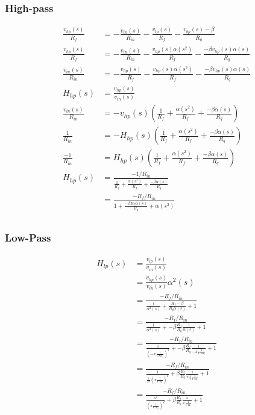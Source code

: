 \documentclass{article}
\begin{document}
\subsubsection{High-pass}

\begin{equation*}
\begin{split}
  \frac{v_{hp}(s)}{R_{f}} & = - \frac{v_{in}(s)}{R_{in}} - \frac{v_{lp}(s)}{R_{f}} - \frac{v_{bp}(s)-\beta}{R_q} \\
  \frac{v_{hp}(s)}{R_{f}} & = - \frac{v_{in}(s)}{R_{in}} - \frac{v_{hp}(s)\alpha(s^2)}{R_{f}} - \frac{{-\beta}v_{hp}(s)\alpha(s)}{R_q} \\
  \frac{v_{in}(s)}{R_{in}} & = - \frac{v_{hp}(s)}{R_{f}} - \frac{v_{hp}(s)\alpha(s^2)}{R_{f}} - \frac{{-\beta}v_{hp}(s)\alpha(s)}{R_q} \\
  H_{hp}(s) & = \frac{v_{hp}(s)}{v_{in}(s)} \\
  \frac{v_{in}(s)}{R_{in}} & = - v_{hp}(s)(\frac{1}{R_{f}} + \frac{\alpha(s^2)}{R_{f}} + \frac{{-\beta}\alpha(s)}{R_q}) \\
  \frac{1}{R_{in}} & = - H_{hp}(s)(\frac{1}{R_{f}} + \frac{\alpha(s^2)}{R_{f}} + \frac{{-\beta}\alpha(s)}{R_q}) \\
  \frac{-1}{R_{in}} & = H_{hp}(s)(\frac{1}{R_{f}} + \frac{\alpha(s^2)}{R_{f}} + \frac{{-\beta}\alpha(s)}{R_q}) \\
  H_{hp}(s) & = \frac{-1/R_{in}}{\frac{1}{R_{f}} + \frac{\alpha(s^2)}{R_{f}} + \frac{{-\beta}\alpha(s)}{R_q}} \\
  & = \frac{-R_{f}/R_{in}}{1 + \frac{{-\beta}R_{f}\alpha(s)}{R_q} + \alpha(s^2) } \\
\end{split}
\end{equation*}

\subsubsection{Low-Pass}

\begin{equation*}
\begin{split}
  H_{lp}(s) & = \frac{v_{lp}(s)}{v_{in}(s)} \\
            & = \frac{v_{hp}(s)}{v_{in}(s)}\alpha^2(s) \\
            & = \frac{-R_{f}/R_{in}}{\frac{1}{\alpha^2(s)} + \frac{R_{f}-\beta}{R_q\alpha(s)} + 1 } \\
            & = \frac{-R_{f}/R_{in}}{\frac{1}{\alpha^2(s)} + -\beta\frac{R_{f}}{R_q}\frac{1}{\alpha(s)} + 1 } \\
            & = \frac{-R_{f}/R_{in}}{\frac{1}{{(-x\frac{1}{CsR_{i}})}^2} + -\beta\frac{R_{f}}{R_q}\frac{1}{-x\frac{1}{CsR_{i}}} + 1 } \\
            & = \frac{-R_{f}/R_{in}}{\frac{1}{{\frac{1}{s^2}(x\frac{1}{CR_{i}})}^2} + \beta\frac{R_{f}}{R_q}\frac{1}{x\frac{1}{s}\frac{1}{CR_{i}}} + 1 } \\
            & = \frac{-R_{f}/R_{in}}{\frac{s^2}{{(x\frac{1}{CR_{i}})}^2} + \beta\frac{R_{f}}{R_q}\frac{s}{x\frac{1}{CR_{i}}} + 1 } \\
\end{split}
\end{equation*}
\end{document}
